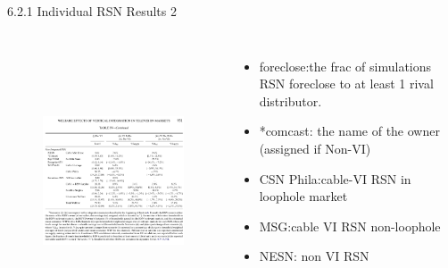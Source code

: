\documentclass[10pt]{beamer}
\begin{document}
\begin{frame}{6.2.1 Individual RSN Results 2}
    \begin{columns}[c] 
    \column{9cm}
    \begin{figure}
        \centering
        \includegraphics[height=8cm]{table4-2}
    \end{figure}
    \column{4cm}
    \begin{itemize}
        \item foreclose:the frac of simulations RSN foreclose to at least 1 rival distributor.
        \item *comcast: the name of the owner (assigned if Non-VI)
        \item CSN Phila:cable-VI RSN in loophole market
        \item MSG:cable VI RSN non-loophole
        \item NESN: non VI RSN
    \end{itemize}
	\end{columns}
\end{frame}
\end{document}

